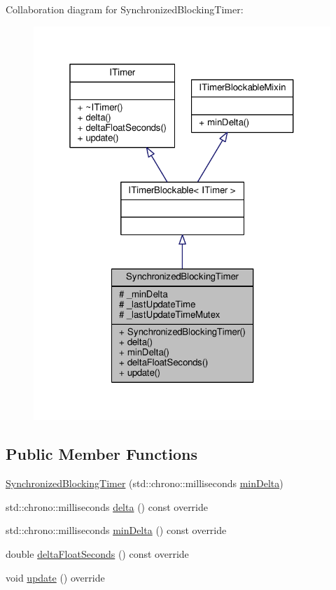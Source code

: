 Collaboration diagram for Synchronized\-Blocking\-Timer\-:
\nopagebreak
\begin{figure}[H]
\begin{center}
\leavevmode
\includegraphics[width=321pt]{class_synchronized_blocking_timer__coll__graph}
\end{center}
\end{figure}
\subsection*{Public Member Functions}
\begin{DoxyCompactItemize}
\item 
\hyperlink{class_synchronized_blocking_timer_a574e962e33397f3ad630f071ebe1b00d}{Synchronized\-Blocking\-Timer} (std\-::chrono\-::milliseconds \hyperlink{class_synchronized_blocking_timer_a42156631ff9193cdfffb60b10c40da05}{min\-Delta})
\item 
std\-::chrono\-::milliseconds \hyperlink{class_synchronized_blocking_timer_a41956960b15f14341f6018e2f5377f4b}{delta} () const override
\item 
std\-::chrono\-::milliseconds \hyperlink{class_synchronized_blocking_timer_a42156631ff9193cdfffb60b10c40da05}{min\-Delta} () const override
\item 
double \hyperlink{class_synchronized_blocking_timer_a0a6306ec32b43c92965b5597c60d51fa}{delta\-Float\-Seconds} () const override
\item 
void \hyperlink{class_synchronized_blocking_timer_aa6e10fdb7eafa40d99f65756bd0d2e63}{update} () override
\end{DoxyCompactItemize}
